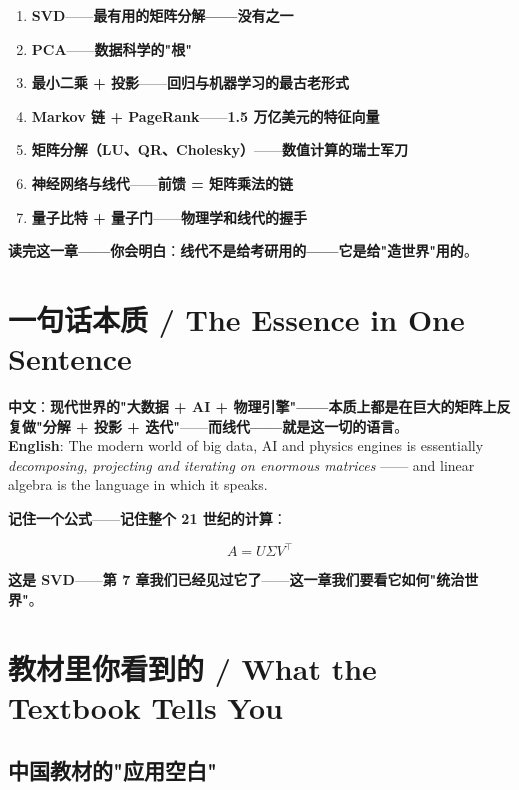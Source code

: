 \begin{enumerate}
\item \textbf{SVD}——\textbf{最有用的矩阵分解——没有之一}
\item \textbf{PCA}——\textbf{数据科学的"根"}
\item \textbf{最小二乘 + 投影}——\textbf{回归与机器学习的最古老形式}
\item \textbf{Markov 链 + PageRank}——\textbf{1.5 万亿美元的特征向量}
\item \textbf{矩阵分解（LU、QR、Cholesky）}——\textbf{数值计算的瑞士军刀}
\item \textbf{神经网络与线代}——\textbf{前馈 = 矩阵乘法的链}
\item \textbf{量子比特 + 量子门}——\textbf{物理学和线代的握手}
\end{enumerate}

\textbf{读完这一章——你会明白}：\textbf{线代不是给考研用的——它是给"造世界"用的}。

\section{一句话本质 / The Essence in One Sentence}

\begin{tcolorbox}[essbox={一句话本质}]
\textbf{中文}：\textbf{现代世界的"大数据 + AI + 物理引擎"——本质上都是\textbf{在巨大的矩阵上反复做"分解 + 投影 + 迭代"}}——\textbf{而线代——就是这一切的语言}。\\[6pt]
\textbf{English}: The modern world of big data, AI and physics engines is essentially \emph{decomposing, projecting and iterating on enormous matrices} —— and linear algebra is the language in which it speaks.
\end{tcolorbox}

\textbf{记住一个公式}——\textbf{记住整个 21 世纪的计算}：

\[
A = U \Sigma V^{\!\top}
\]

\textbf{这是 SVD}——\textbf{第 7 章我们已经见过它了}——\textbf{这一章我们要看它如何"统治世界"}。

\section{教材里你看到的 / What the Textbook Tells You}

\subsection{中国教材的"应用空白"}

